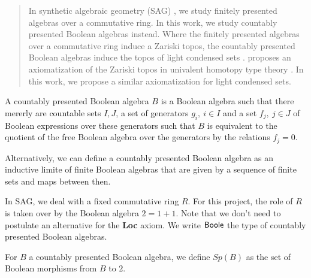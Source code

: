 \begin{abstract}
In synthetic algebraic geometry (SAG) \cite{draft}, we study finitely presented algebras over a commutative ring. 
In this work, we study countably presented Boolean algebras instead. 
Where the finitely presented algebras over a commutative ring induce a Zariski topos, 
the countably presented Boolean algebras induce the topos of light condensed sets \cite{TODO}. 
\cite{draft} proposes an axiomatization of the Zariski topos in univalent homotopy type theory \cite{HoTT}. 
In this work, we propose a similar axiomatization for light condensed sets. 
\end{abstract} 

\begin{definition}
  A countably presented Boolean algebra $B$ is a Boolean algebra such that there mererly are countable sets $I,J$, 
  a set of generators $g_i,~{i\in I}$ and a set $f_j,~{j\in J}$ of Boolean expressions over these generators 
  such that $B$ is equivalent to the quotient of the free Boolean algebra over the generators by the relations
  $f_j=0$.
\end{definition} 

Alternatively, we can define a countably presented Boolean algebra as an inductive limite of finite Boolean algebras
that are given by a sequence of finite sets and maps between then.

 \medskip

In SAG, we deal with a fixed commutative ring $R$. For this project, the role of $R$ is taken over by 
the Boolean algebra $2 = 1+1$. Note that we don't need to postulate an alternative for the \textbf{Loc} axiom. 
We write $\mathsf{Boole}$ the type of countably presented Boolean algebras.



\medskip





\begin{definition}
  For $B$ a countably presented Boolean algebra, we define $Sp(B)$ as the set of Boolean morphisms from $B$ to $2$. 
\end{definition}

